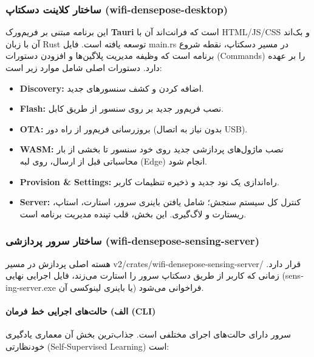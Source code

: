 \documentclass[12pt, a4paper]{article}
\newcommand{\lr}[1]{\foreignlanguage{english}{#1}}
\begin{document}
\subsubsection{ساختار کلاینت دسکتاپ (\lr{wifi-densepose-desktop})}
این برنامه مبتنی بر فریم‌ورک \textbf{\lr{Tauri}} است که فرانت‌اند آن با \lr{HTML/JS/CSS} و بک‌اند آن با زبان \lr{Rust} توسعه یافته است. فایل \lr{main.rs} در مسیر دسکتاپ، نقطه شروع برنامه است که وظیفه مدیریت پلاگین‌ها و افزودن دستورات (\lr{Commands}) را بر عهده دارد. دستورات اصلی شامل موارد زیر است:

\begin{itemize}
    \item \textbf{\lr{Discovery}:} اضافه کردن و کشف سنسورهای جدید.
    \item \textbf{\lr{Flash}:} نصب فریم‌ور جدید بر روی سنسور از طریق کابل.
    \item \textbf{\lr{OTA}:} بروزرسانی فریم‌ور از راه دور (بدون نیاز به اتصال \lr{USB}).
    \item \textbf{\lr{WASM}:} نصب ماژول‌های پردازشی جدید روی خود سنسور تا بخشی از بار محاسباتی قبل از ارسال، روی لبه (\lr{Edge}) انجام شود.
    \item \textbf{\lr{Provision \& Settings}:} راه‌اندازی یک نود جدید و ذخیره تنظیمات کاربر.
    \item \textbf{\lr{Server}:} کنترل کل سیستم سنجش؛ شامل یافتن باینری سرور، استارت، استاپ، ریستارت و لاگ‌گیری. این بخش، قلب تپنده مدیریت برنامه است.
\end{itemize}

\subsubsection{ساختار سرور پردازشی (\lr{wifi-densepose-sensing-server})}
هسته اصلی پردازش در مسیر \lr{v2/crates/wifi-densepose-sensing-server/} قرار دارد. زمانی که کاربر از طریق دسکتاپ سرور را استارت می‌زند، فایل اجرایی نهایی (\lr{sensing-server.exe} یا باینری لینوکسی آن) فراخوانی می‌شود.

\paragraph{الف) حالت‌های اجرایی خط فرمان (CLI)}
سرور دارای حالت‌های اجرای مختلفی است. جذاب‌ترین بخش آن معماری یادگیری خودنظارتی (\lr{Self-Supervised Learning}) است:
\end{document}
